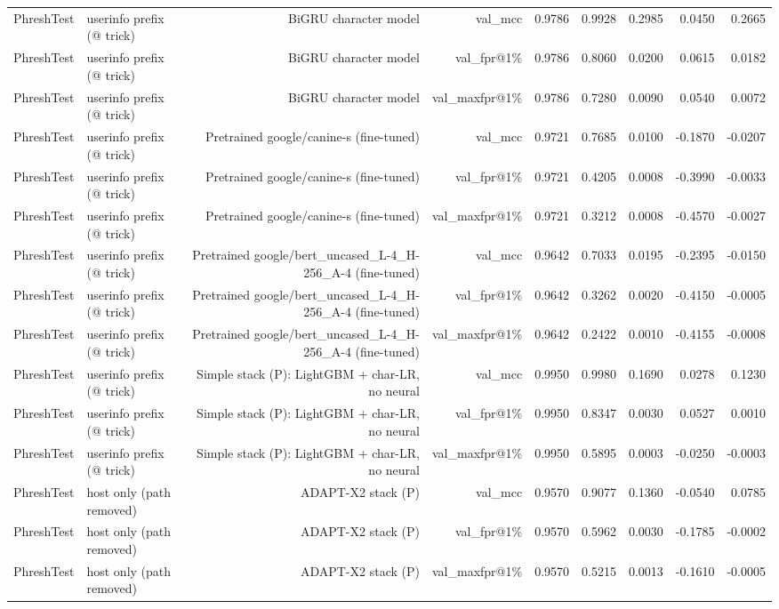 \begin{table}[t]
\begin{tabular}{llrrrrrrr}
PhreshTest & userinfo prefix (@ trick) & BiGRU character model & val\_mcc & 0.9786 & 0.9928 & 0.2985 & 0.0450 & 0.2665 \\
PhreshTest & userinfo prefix (@ trick) & BiGRU character model & val\_fpr@1\% & 0.9786 & 0.8060 & 0.0200 & 0.0615 & 0.0182 \\
PhreshTest & userinfo prefix (@ trick) & BiGRU character model & val\_maxfpr@1\% & 0.9786 & 0.7280 & 0.0090 & 0.0540 & 0.0072 \\
PhreshTest & userinfo prefix (@ trick) & Pretrained google/canine-s (fine-tuned) & val\_mcc & 0.9721 & 0.7685 & 0.0100 & -0.1870 & -0.0207 \\
PhreshTest & userinfo prefix (@ trick) & Pretrained google/canine-s (fine-tuned) & val\_fpr@1\% & 0.9721 & 0.4205 & 0.0008 & -0.3990 & -0.0033 \\
PhreshTest & userinfo prefix (@ trick) & Pretrained google/canine-s (fine-tuned) & val\_maxfpr@1\% & 0.9721 & 0.3212 & 0.0008 & -0.4570 & -0.0027 \\
PhreshTest & userinfo prefix (@ trick) & Pretrained google/bert\_uncased\_L-4\_H-256\_A-4 (fine-tuned) & val\_mcc & 0.9642 & 0.7033 & 0.0195 & -0.2395 & -0.0150 \\
PhreshTest & userinfo prefix (@ trick) & Pretrained google/bert\_uncased\_L-4\_H-256\_A-4 (fine-tuned) & val\_fpr@1\% & 0.9642 & 0.3262 & 0.0020 & -0.4150 & -0.0005 \\
PhreshTest & userinfo prefix (@ trick) & Pretrained google/bert\_uncased\_L-4\_H-256\_A-4 (fine-tuned) & val\_maxfpr@1\% & 0.9642 & 0.2422 & 0.0010 & -0.4155 & -0.0008 \\
PhreshTest & userinfo prefix (@ trick) & Simple stack (P): LightGBM + char-LR, no neural & val\_mcc & 0.9950 & 0.9980 & 0.1690 & 0.0278 & 0.1230 \\
PhreshTest & userinfo prefix (@ trick) & Simple stack (P): LightGBM + char-LR, no neural & val\_fpr@1\% & 0.9950 & 0.8347 & 0.0030 & 0.0527 & 0.0010 \\
PhreshTest & userinfo prefix (@ trick) & Simple stack (P): LightGBM + char-LR, no neural & val\_maxfpr@1\% & 0.9950 & 0.5895 & 0.0003 & -0.0250 & -0.0003 \\
PhreshTest & host only (path removed) & ADAPT-X2 stack (P) & val\_mcc & 0.9570 & 0.9077 & 0.1360 & -0.0540 & 0.0785 \\
PhreshTest & host only (path removed) & ADAPT-X2 stack (P) & val\_fpr@1\% & 0.9570 & 0.5962 & 0.0030 & -0.1785 & -0.0002 \\
PhreshTest & host only (path removed) & ADAPT-X2 stack (P) & val\_maxfpr@1\% & 0.9570 & 0.5215 & 0.0013 & -0.1610 & -0.0005 \\

\end{tabular}
\end{table}
